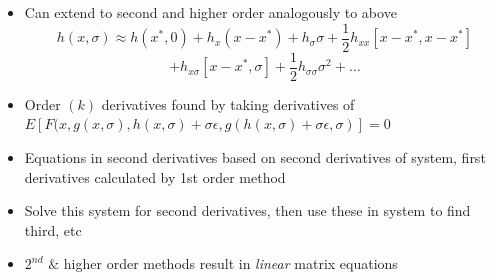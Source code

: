 \documentclass[bigger,handout]{beamer}
\begin{document}
\begin{frame}
\begin{itemize}
\item Can extend to second and higher order analogously to above
\begin{equation*}
h(x,\sigma)\approx h(x^{*},0)+h_{x}(x-x^{*})+h_{\sigma}\sigma+\frac{1}{2}h_{xx}\left[x-x^{*},x-x^{*}\right]
\end{equation*}
\begin{equation*}
+h_{x\sigma}\left[x-x^{*},\sigma\right]+\frac{1}{2}h_{\sigma\sigma}\sigma^2+\ldots
\end{equation*}
\item Order $(k)$ derivatives found by taking derivatives of $E[F(x,g(x,\sigma),h(x,\sigma)+\sigma\epsilon,g(h(x,\sigma)+\sigma\epsilon,\sigma)]=0$
\item Equations in second derivatives based on second derivatives of system, first derivatives calculated by 1st order method
\item Solve this system for second derivatives, then use these in system to find third, etc
\item $2^{nd}$ $\&$ higher order methods result in \emph{linear} matrix equations





\end{itemize}

\end{frame}%
\end{document}
